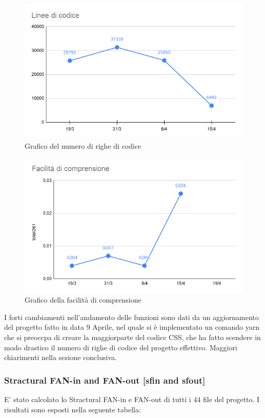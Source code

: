     \begin{figure}[H]
        \centering
        \includegraphics[width=10 cm]{source/sections/images/numCodice.png}
        \caption{Grafico del numero di righe di codice}
    \end{figure}

    \begin{figure}[H]
        \centering
        \includegraphics[width=10 cm]{source/sections/images/facilita_comprensione.png}
        \caption{Grafico della facilità di comprensione}
    \end{figure}

    I forti cambiamenti nell'andamento delle funzioni sono dati da un aggiornamento del progetto fatto in data
    9 Aprile, nel quale si è implementato un comando yarn che si preoccpa di creare la maggiorparte del
    codice CSS, che ha fatto scendere in modo drastico il numero di righe di codice del progetto effettivo. Maggiori chiarimenti nella sezione conclusiva.

\subsubsection{Stractural FAN-in and FAN-out  [sfin and sfout]}
    E' stato calcolato lo Stractural FAN-in e FAN-out di tutti i 44 file del progetto. I risultati sono esposti nella seguente tabella:

